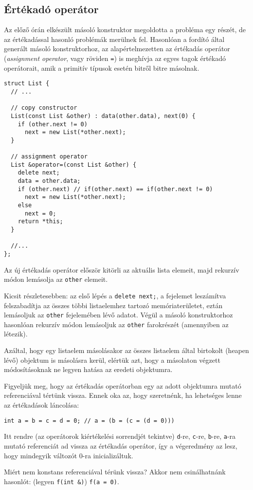 \documentclass[../cpp_book/cpp_book.tex]{subfiles}
\begin{document}
	\subsection{Értékadó operátor}
  Az előző órán elkészült másoló konstruktor megoldotta a probléma egy részét, de az értékadással hasonló problémák merülnek fel. Hasonlóan a fordító által generált másoló konstruktorhoz, az alapértelmezetten az értékadás operátor (\textit{assignment operator}, vagy röviden \texttt{=}) is meghívja az egyes tagok értékadó operátorait, amik a primitív típusok esetén bitről bitre másolnak.
\begin{lstlisting}
struct List {
  // ...

  // copy constructor
  List(const List &other) : data(other.data), next(0) {
    if (other.next != 0)
      next = new List(*other.next);
  }

  // assignment operator
  List &operator=(const List &other) {
    delete next;
    data = other.data;
    if (other.next) // if(other.next) == if(other.next != 0)
      next = new List(*other.next);
    else
      next = 0;
    return *this;
  }

  //...
};
\end{lstlisting}
	Az új értékadás operátor először kitörli az aktuális lista elemeit, majd rekurzív módon lemásolja az \texttt{other} elemeit.
	
  Kicsit részletesebben: az első lépés a \texttt{delete next;}, a fejelemet leszámítva felszabadítja az összes többi listaelemhez tartozó memóriaterületet, eztán lemásoljuk az \texttt{other} fejelemében lévő adatot. Végül a másoló konstruktorhoz hasonlóan rekurzív módon lemásoljuk az \texttt{other} farokrészét (amennyiben az létezik).
	
  Azáltal, hogy egy listaelem másolásakor az összes listaelem által birtokolt (heapen lévő) objektum is másolásra kerül, elértük azt, hogy a másolaton végzett módosításoknak ne legyen hatása az eredeti objektumra.
	\medskip
	
	Figyeljük meg, hogy az értékadás operátorban egy az adott objektumra mutató referenciával tértünk vissza. Ennek oka az, hogy szeretnénk, ha lehetséges lenne az értékadások láncolása:
	\begin{lstlisting}
int a = b = c = d = 0; // a = (b = (c = (d = 0)))
	\end{lstlisting}
  Itt rendre (az operátorok kiértékelési sorrendjét tekintve) \texttt{d}-re, \texttt{c}-re, \texttt{b}-re, \texttt{a}-ra mutató referenciát ad vissza az értékadás operátor, így a végeredmény az lesz, hogy mindegyik változót 0-ra inicializáltuk.
	\begin{note}
    Miért nem konstans referenciával térünk vissza? Akkor nem csinálhatnánk hasonlót: (legyen \texttt{f(int \&)}) \texttt{f(a = 0)}.
	\end{note}
	
\end{document}
